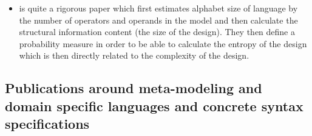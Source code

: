 \begin{itemize}
   \item \cite{braha_measurement_1998} is quite a rigorous paper which first estimates alphabet size of language by the number of operators and operands in the model and then calculate the structural information content (the size of the design). They then define a probability measure in order to be able to calculate the entropy of the design which is then directly related to the complexity of the design.
  \end{itemize}


\subsection{Publications around meta-modeling and domain specific languages and concrete syntax specifications}

